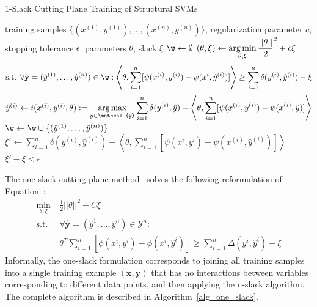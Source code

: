 \begin{algorithm*}[t]
    \caption{1-Slack Cutting Plane Training of Structural SVMs \label{alg_one_slack}}
    \begin{algorithmic}[1]
        \require training samples $\{ (x^{(1)}, y^{(1)}), \dots, (x^{(n)}, y^{(n)})\}$, regularization parameter $c$, stopping tolerance $\epsilon$.
        \ensure parameters $\theta$, slack $\xi$
        \state $\w \leftarrow \emptyset$
        \repeat
            \state $(\theta, \xi) \leftarrow \displaystyle \operatorname*{arg\,min}_{\theta, \xi} \frac{||\theta||}{2}^2 + c \xi$\label{restricted}\\
            \begin{equation*}
                \text{s.t. }\forall \hat{\mathbf{y}}=(\hat{y}^{(1)}, \dots, \hat{y}^{(n)}) \in \w:
                \left \langle \theta, \sum_{i=1}^n [\psi(x^{(i)}, y^{(i)}) - \psi(x^i, \hat{y}^{(i)})] \right \rangle \geq \sum_{i=1}^n \delta(y^{(i)}, \hat{y}^{(i)})
                - \xi
            \end{equation*}
                \state
                $\hat{y}^{(i)} \leftarrow i(x^{(i)}, y^{(i)}, \theta) := \displaystyle \argmax_{\hat{y}\in\mathcal{y}} \sum_{i=1}^n \delta(y^{(i)}, \hat{y}) - \left \langle \theta, \sum_{i=1}^n [\psi(x^{(i)}, y^{(i)}) - \psi(x^{(i)}, \hat{y})] \right \rangle$ \label{get_cutting_plane}
            \endfor
            \state $\w \leftarrow \w \cup \{ (\hat{y}^{(1)}, \dots, \hat{y}^{(n)}) \} $
            \state $ \displaystyle \xi' \leftarrow  \sum_{i=1}^n \delta(y^{(i)}, \hat{y}^{(i)}) - \left \langle \theta, \sum_{i=1}^n [\psi(x^i, y^i) - \psi(x^{(i)}, \hat{y}^{(i)})] \right \rangle$
        \until $\xi' - \xi < \epsilon$ \label{convergence_check}
    \end{algorithmic}
\end{algorithm*}

The one-slack cutting plane method~\citep{joachims2009cutting} solves the
following reformulation of Equation~:
\begin{align}\label{eq:oneslack}
    \min_{\theta, \xi}\ &\frac{1}{2} ||\theta||^2 + C \xi\\
    \text{s.t. }&\forall \hat{\mathbf{y}}=(\hat{y}^1, \dots, \hat{y}^n) \in \mathcal{Y}^n:\\
        &\theta^T \sum_{i=1}^n [\phi(x^i, y^i) - \phi(x^i,
            \hat{y}^i)] \geq \sum_{i=1}^n \Delta(y^i, \hat{y}^i)
            - \xi
\end{align}
Informally, the one-slack formulation corresponds to joining all training
samples into a single training example $(\mathbf{x}, \mathbf{y})$ that has no
interactions between variables corresponding to different data points, and
then applying the n-slack algorithm.
The complete algorithm is described in Algorithm~\ref{alg_one_slack}.

